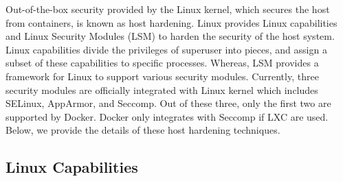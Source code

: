Out-of-the-box security provided by the Linux kernel, which secures the
host from containers, is known as host hardening.
Linux provides Linux capabilities and Linux Security Modules (LSM)
to harden the security of the host system. Linux capabilities divide
the privileges of superuser into pieces, and assign a subset of these
capabilities to specific processes. Whereas, LSM provides a framework
for Linux to support various security modules. Currently, three security
modules are officially integrated with Linux kernel which includes SELinux,
AppArmor, and Seccomp. Out of these three, only the first two are
supported by Docker. Docker only integrates with Seccomp if LXC are used.
Below, we provide the details of these host hardening techniques.

\subsection{Linux Capabilities}

